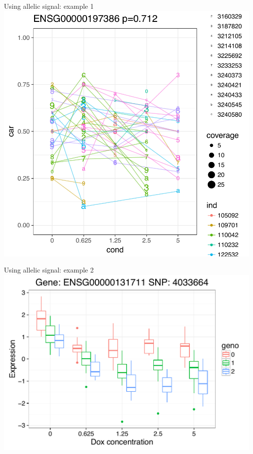 \documentclass{beamer}
\begin{document}
\begin{frame}{Using allelic signal: example 1}
\centering
\includegraphics[width=.7\textwidth,clip,trim=0 0 0 0]{../figures/ENSG00000197386_ase.pdf}
\end{frame}

\begin{frame}{Using allelic signal: example 2}
\centering
\includegraphics[width=\textwidth,clip,trim=0 0 0 0]{../figures/56.pdf}
\end{frame}
\end{document}
